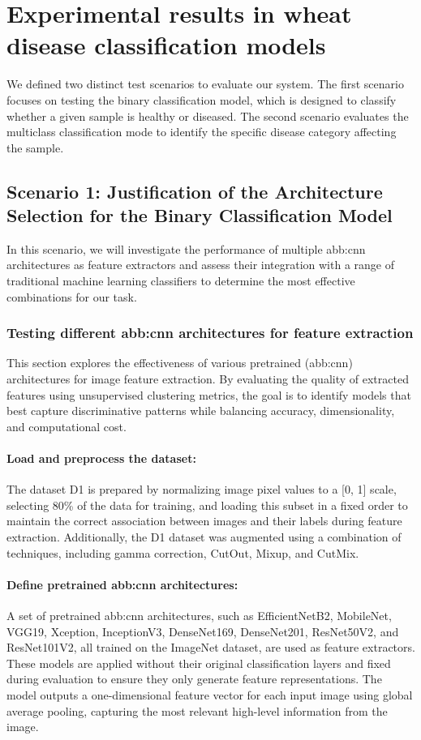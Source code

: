 \section{Experimental results in wheat disease classification models}

We defined two distinct test scenarios to evaluate our system. The first scenario focuses on testing the binary classification model, which is designed to classify whether a given sample is healthy or diseased. The second scenario evaluates the multiclass classification mode to identify the specific disease category affecting the sample.

\subsection{Scenario 1: Justification of the Architecture Selection for the Binary Classification Model}
\label{sec:testcnnModel1}
In this scenario, we will investigate the performance of multiple \gls{abb:cnn} architectures as feature extractors and assess their integration with a range of traditional machine learning classifiers to determine the most effective combinations for our task.
\subsubsection{Testing different \gls{abb:cnn} architectures for feature extraction}
This section explores the effectiveness of various pretrained (\gls{abb:cnn}) architectures for image feature extraction. By evaluating the quality of extracted features using unsupervised clustering metrics, the goal is to identify models that best capture discriminative patterns while balancing accuracy, dimensionality, and computational cost.

\paragraph{Load and preprocess the dataset:}  
The dataset D1 is prepared by normalizing image pixel values to a [0, 1] scale, selecting 80\% of the data for training, and loading this subset in a fixed order to maintain the correct association between images and their labels during feature extraction. Additionally, the D1 dataset was augmented using a combination of techniques, including gamma correction, CutOut, Mixup, and CutMix.

\paragraph{Define pretrained \gls{abb:cnn} architectures:}  
A set of pretrained \gls{abb:cnn} architectures, such as EfficientNetB2, MobileNet, VGG19, Xception, InceptionV3, DenseNet169, DenseNet201, ResNet50V2, and ResNet101V2, all trained on the ImageNet dataset, are used as feature extractors. These models are applied without their original classification layers and fixed during evaluation to ensure they only generate feature representations. The model outputs a one-dimensional feature vector for each input image using global average pooling, capturing the most relevant high-level information from the image.

